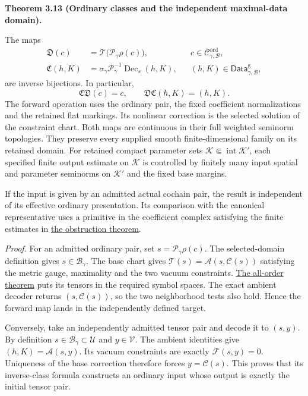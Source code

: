\documentclass[
  english,
  11pt,
  reqno]{amsart}
\makeatletter
\newcommand{\pandocstatementheading}[1]{%
  \par\if@nobreak\else
    \addpenalty{\@beginparpenalty}%
    \addvspace{.5\baselineskip plus .2\baselineskip minus .2\baselineskip}%
  \fi
  {\normalfont\bfseries #1\par}%
  \nobreak\@afterindenttrue\@afterheading
}
\makeatother
\begin{document}
\pandocstatementheading{\leavevmode{}\label{thm:online-ordinary-pair-data-bijection}Theorem 3.13 (Ordinary classes and the independent maximal-data domain).}

The maps%
\[
\begin{aligned}
\mathfrak D(c)
&=\mathcal T\bigl(\mathscr P_\gamma\rho(c)\bigr),
&&c\in\mathscr C^{\mathrm{ord}}_{\gamma,\mathcal B},\\
\mathfrak C(h,K)
&=\sigma_\gamma\mathscr P_\gamma^{-1}
       \operatorname{Dec}_{s}(h,K),
&&(h,K)\in\mathsf{Data}^{\mathrm g}_{\gamma,\mathcal B},
\end{aligned}
\] are inverse bijections. In particular,%
 \[
\mathfrak C\mathfrak D(c)=c,
\qquad
\mathfrak D\mathfrak C(h,K)=(h,K).
\] The forward operation uses the ordinary pair, the fixed coefficient
normalizations and the retained flat markings. Its nonlinear correction
is the selected solution of the constraint chart. Both maps are
continuous in their full weighted seminorm topologies. They preserve
every supplied smooth finite-dimensional family on its retained domain.
For retained compact parameter sets
\(\mathcal K\Subset\operatorname{int}\mathcal K'\), each specified
finite output estimate on \(\mathcal K\) is controlled by finitely many
input spatial and parameter seminorms on \(\mathcal K'\) and the fixed
base margins.

If the input is given by an admitted actual cochain pair, the result is
independent of its effective ordinary presentation. Its comparison with
the canonical representative uses a primitive in the coefficient complex
satisfying the finite estimates in
\hyperref[thm:online-actual-cochain-obstruction-test]{the obstruction
theorem}.

\emph{Proof.} For an admitted ordinary pair, set
\(s=\mathscr P_\gamma\rho(c)\). The selected-domain definition gives
\(s\in\mathcal B_\gamma\). The base chart gives
\(\mathcal T(s)=\mathcal A(s,\mathcal C(s))\) satisfying the metric
gauge, maximality and the two vacuum constraints.
\hyperref[thm:online-chart-one-branch-weighted-smoothness]{The all-order
theorem} puts its tensors in the required symbol spaces. The exact
ambient decoder returns \((s,\mathcal C(s))\), so the two neighborhood
tests also hold. Hence the forward map lands in the independently
defined target.

Conversely, take an independently admitted tensor pair and decode it to
\((s,y)\). By definition \(s\in\mathcal B_\gamma\subset\mathcal U\) and
\(y\in\mathcal V\). The ambient identities give
\((h,K)=\mathcal A(s,y)\). Its vacuum constraints are exactly
\(\mathcal F(s,y)=0\). Uniqueness of the base correction therefore
forces \(y=\mathcal C(s)\). This proves that its inverse-class formula
constructs an ordinary input whose output is exactly the initial tensor
pair.
\end{document}
